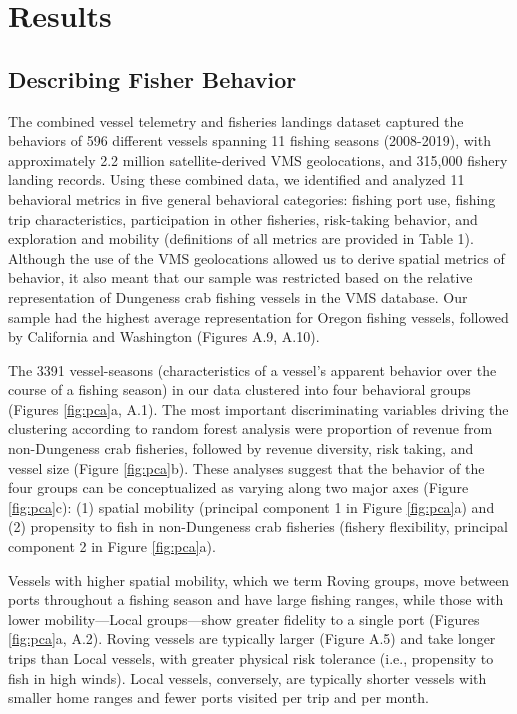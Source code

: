 \documentclass[]{elsarticle} %
\begin{document}
\hypertarget{results}{%
\section{Results}\label{results}}

\hypertarget{describing-fisher-behavior}{%
\subsection{Describing Fisher
Behavior}\label{describing-fisher-behavior}}

The combined vessel telemetry and fisheries landings dataset captured
the behaviors of 596 different vessels spanning 11 fishing seasons
(2008-2019), with approximately 2.2 million satellite-derived VMS
geolocations, and 315,000 fishery landing records. Using these combined
data, we identified and analyzed 11 behavioral metrics in five general
behavioral categories: fishing port use, fishing trip characteristics,
participation in other fisheries, risk-taking behavior, and exploration
and mobility (definitions of all metrics are provided in Table 1).
Although the use of the VMS geolocations allowed us to derive spatial
metrics of behavior, it also meant that our sample was restricted based
on the relative representation of Dungeness crab fishing vessels in the
VMS database. Our sample had the highest average representation for
Oregon fishing vessels, followed by California and Washington (Figures
A.9, A.10).

The 3391 vessel-seasons (characteristics of a vessel's apparent behavior
over the course of a fishing season) in our data clustered into four
behavioral groups (Figures \ref{fig:pca}a, A.1). The most important
discriminating variables driving the clustering according to random
forest analysis were proportion of revenue from non-Dungeness crab
fisheries, followed by revenue diversity, risk taking, and vessel size
(Figure \ref{fig:pca}b). These analyses suggest that the behavior of the
four groups can be conceptualized as varying along two major axes
(Figure \ref{fig:pca}c): (1) spatial mobility (principal component 1 in
Figure \ref{fig:pca}a) and (2) propensity to fish in non-Dungeness crab
fisheries (fishery flexibility, principal component 2 in Figure
\ref{fig:pca}a).

Vessels with higher spatial mobility, which we term Roving groups, move
between ports throughout a fishing season and have large fishing ranges,
while those with lower mobility---Local groups---show greater fidelity
to a single port (Figures \ref{fig:pca}a, A.2). Roving vessels are
typically larger (Figure A.5) and take longer trips than Local vessels,
with greater physical risk tolerance (i.e., propensity to fish in high
winds). Local vessels, conversely, are typically shorter vessels with
smaller home ranges and fewer ports visited per trip and per month.
\end{document}
